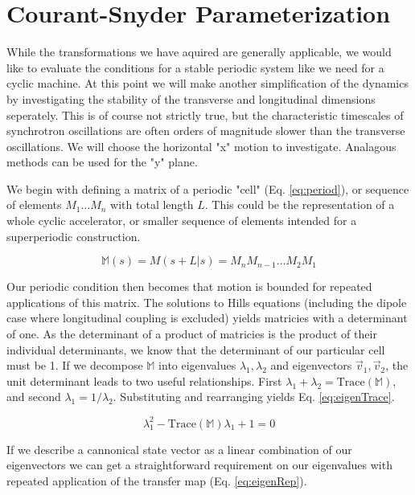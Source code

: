 \section{Courant-Snyder Parameterization} \label{sec:CSparam}
While the transformations we have aquired are generally applicable, we would like to evaluate the conditions for a stable periodic system like we need for a cyclic machine. At this point we will make another simplification of the dynamics by investigating the stability of the transverse and longitudinal dimensions seperately. This is of course not strictly true, but the characteristic timescales of synchrotron oscillations are often orders of magnitude slower than the transverse oscillations. We will choose the horizontal "x" motion to investigate. Analagous methods can be used for the "y" plane.

We begin with defining a matrix of a periodic "cell" (Eq. \ref{eq:period}), or sequence of elements $M_1 \dots M_n$ with total length $L$. This could be the representation of a whole cyclic accelerator, or smaller sequence of elements intended for a superperiodic construction.

\begin{equation} \label{eq:period}
	\mathbb{M}(s) = M(s+L|s) = M_nM_{n-1}\dots M_2M_1
\end{equation}

Our periodic condition then becomes that motion is bounded for repeated applications of this matrix. The solutions to Hills equations (including the dipole case where longitudinal coupling is excluded) yields matricies with a determinant of one. As the determinant of a product of matricies is the product of their individual determinants, we know that the determinant of our particular cell must be 1. If we decompose $\mathbb{M}$ into eigenvalues $\lambda_1, \lambda_2$ and eigenvectors $\vec{v}_1, \vec{v}_2$, the unit determinant leads to two useful relationships. First $\lambda_1 + \lambda_2 = \mathrm{Trace}(\mathbb{M})$, and second $\lambda_1 = 1/\lambda_2$. Substituting and rearranging yields Eq. \ref{eq:eigenTrace}.

\begin{equation} \label{eq:eigenTrace}
	\lambda_1^2 - \mathrm{Trace}(\mathbb{M})\lambda_1 + 1 = 0
\end{equation}

If we describe a cannonical state vector as a linear combination of our eigenvectors we can get a straightforward requirement on our eigenvalues with repeated application of the transfer map (Eq. \ref{eq:eigenRep}).

